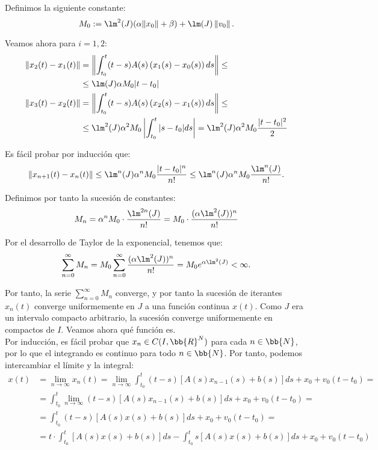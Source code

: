 \begin{ejercicio}
    Definimos la siguiente constante:
    \begin{equation*}
        M_0:= \lm^2(J)(\alpha\|x_0\|+\beta)+ \lm(J)\left\|v_0\right\|.
    \end{equation*}

    Veamos ahora para $i=1,2$:
    \begin{align*}
        \|x_2(t) - x_1(t)\| &= \left\|\int_{t_0}^t (t - s)A(s)\left(x_1(s) - x_0(s)\right)ds\right\|
        \leq \\&\leq
        \lm(J)\alpha M_0 |t-t_0|\\
        \|x_3(t) - x_2(t)\| &= \left\|\int_{t_0}^t (t - s)A(s)\left(x_2(s) - x_1(s)\right)ds\right\|
        \leq \\&\leq
        \lm^2(J)\alpha^2 M_0 \left|\int_{t_0}^t |s-t_0|ds\right|
        = \lm^2(J)\alpha^2 M_0 \frac{|t-t_0|^2}{2}
    \end{align*}

    Es fácil probar por inducción que:
    \begin{equation*}
        \|x_{n+1}(t) - x_{n}(t)\| \leq \lm^{n}(J)\alpha^{n}M_0\frac{|t-t_0|^{n}}{n!}\leq \lm^{n}(J)\alpha^{n}M_0\frac{\lm^{n}(J)}{n!}.
    \end{equation*}

    Definimos por tanto la sucesión de constantes:
    \begin{equation*}
        M_{n} = \alpha^{n}M_0\cdot \frac{\lm^{2n}(J)}{n!}
        = M_0\cdot \frac{(\alpha\lm^2(J))^n}{n!}
    \end{equation*}

    Por el desarrollo de Taylor de la exponencial, tenemos que:
    \begin{equation*}
        \sum_{n=0}^{\infty}M_n = M_0\sum_{n=0}^{\infty}\frac{(\alpha\lm^2(J))^n}{n!} = M_0e^{\alpha\lm^2(J)}<\infty.
    \end{equation*}

    Por tanto, la serie $\sum\limits_{n=0}^{\infty}M_n$ converge, y por tanto la sucesión de iterantes $x_n(t)$ converge uniformemente en $J$ a una función continua $x(t)$. Como $J$ era un intervalo compacto arbitrario, la sucesión converge uniformemente en compactos de $I$. Veamos ahora qué función es.\\
    
    Por inducción, es fácil probar que $x_n\in C(I, \bb{R}^N)$ para cada $n\in \bb{N}$, por lo que el integrando es continuo para todo $n\in \bb{N}$. Por tanto, podemos intercambiar el límite y la integral:
    \begin{align*}
        x(t) &= \lim_{n\to \infty}x_n(t)
        = \lim_{n\to \infty}\int_{t_0}^t (t - s)[A(s)x_{n-1}(s) + b(s)]ds + x_0 + v_0(t - t_0)
        =\\&=
        \int_{t_0}^t \lim_{n\to \infty}(t - s)[A(s)x_{n-1}(s) + b(s)]ds + x_0 + v_0(t - t_0)
        =\\&=
        \int_{t_0}^t (t - s)[A(s)x(s) + b(s)]ds + x_0 + v_0(t - t_0)
        =\\&= 
        t\cdot \int_{t_0}^t[A(s)x(s) + b(s)]ds -\int_{t_0}^t s[A(s)x(s) + b(s)]ds + x_0 + v_0(t - t_0)
    \end{align*}


\end{ejercicio}
